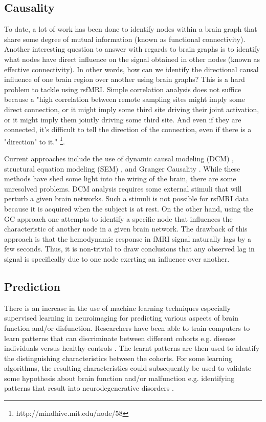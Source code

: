 \subsection*{Causality}
To date, a lot of work has been done to identify nodes within a brain graph that share some degree of mutual information (known as functional connectivity). Another interesting question to answer with regards to brain graphs is to identify what nodes have direct influence on the signal obtained in other nodes (known as effective connectivity). In other words, how can we identify the directional causal influence of one brain region over another using brain graphs? This is a hard problem to tackle using rsfMRI. Simple correlation analysis does not suffice because a "high correlation between remote sampling sites might imply some direct connection, or it might imply some third site driving their joint activation, or it might imply them jointly driving some third site. And even if they are connected, it's difficult to tell the direction of the connection, even if there is a "direction" to it." \footnote{http://mindhive.mit.edu/node/58}. 

Current approaches include the use of dynamic causal modeling (DCM) \cite{}, structural equation modeling (SEM) \cite{}, and Granger Causality \cite{}. While these methods have shed some light into the wiring of the brain, there are some unresolved problems. DCM analysis requires some external stimuli that will perturb a given brain networks. Such a stimuli is not possible for rsfMRI data because it is acquired when the subject is at rest. On the other hand, using the GC approach one attempts to identify a specific node that influences the characteristic of another node in a given brain network. The drawback of this approach is that the hemodynamic response in fMRI signal naturally lags by a few seconds. Thus, it is non-trivial to draw conclusions that any observed lag in signal is specifically due to one node exerting an influence over another.   

\subsection*{Prediction}
There is an increase in the use of machine learning techniques especially supervised learning in neuroimaging for predicting various aspects of brain function and/or disfunction. Researchers have been able to train computers to learn patterns that can discriminate between different cohorts e.g. disease individuals versus healthy controls \cite{Richiardi2013}. The learnt patterns are then used to identify the distinguishing characteristics between the cohorts. For some learning algorithms, the resulting characteristics could subsequently be used to validate some hypothesis about brain function and/or malfunction \cite{} e.g. identifying patterns that result into neurodegenerative disorders \cite{WeeMICCAI2013}. 

